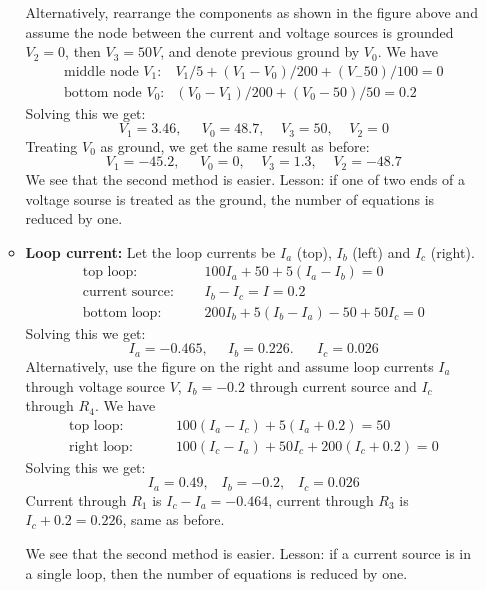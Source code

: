 \begin{enumerate}
\begin{itemize}
    Alternatively, rearrange the components as shown in the figure 
    above and assume the node between the current and voltage sources
    is grounded $V_2=0$, then $V_3=50V$, and denote previous ground by
    $V_0$. We have 
    \[
    \begin{array}{ll}
      \mbox{middle node $V_1$:} & V_1/5+(V_1-V_0)/200+(V_-50)/100=0\\
      \mbox{bottom node $V_0$:} & (V_0-V_1)/200+(V_0-50)/50=0.2 
    \end{array} 
    \]
    Solving this we get: 
    \[
    V_1=3.46,\;\;\;\;\;V_0=48.7,\;\;\;\;V_3=50,\;\;\;\;V_2=0
    \]
    Treating $V_0$ as ground, we get the same result as before: 
    \[
    V_1=-45.2,\;\;\;\;\;V_0=0,\;\;\;\;V_3=1.3,\;\;\;\;V_2=-48.7 
    \]
    We see that the second method is easier. Lesson: if one of two ends 
    of a voltage sourse is treated as the ground, the number of equations 
    is reduced by one.
  \item {\bf Loop current:} Let the loop currents be $I_a$ (top), 
    $I_b$ (left) and $I_c$ (right). 
    \[
    \begin{array}{ll}
      \mbox{top loop:}\;\;\;\;\;\;& 100I_a+50+5(I_a-I_b)=0\\
      \mbox{current source:} \;\;\;\;\;& I_b-I_c=I=0.2\\
      \mbox{bottom loop:}\;\;\;\;\;\;& 200I_b+5(I_b-I_a)-50+50I_c=0 
    \end{array} 
    \]
    Solving this we get: 
    \[
    I_a=-0.465,\;\;\;\;\;I_b=0.226.\;\;\;\;\;\;I_c=0.026 
    \]
    Alternatively, use the figure on the right and assume loop currents 
    $I_a$ through voltage source $V$, $I_b=-0.2$ through current source and 
    $I_c$ through  $R_4$. We have 
    \[
    \begin{array}{ll}
      \mbox{top loop: }\;\;\;\;\;\;\;&100(I_a-I_c)+5(I_a+0.2)=50\\
      \mbox{right loop: }\;\;\;\;\;\;\;&100(I_c-I_a)+50I_c+200(I_c+0.2)=0 
    \end{array}
    \]
    Solving this we get: 
    \[
    I_a=0.49,\;\;\;I_b=-0.2,\;\;\;I_c=0.026 
    \]
    Current through $R_1$ is  $I_c-I_a=-0.464$, current through $R_3$ is 
    $I_c+0.2=0.226$, same as before.

    We see that the second method is easier. Lesson: if a current source 
    is in a single loop, then the number of equations is reduced by one.

  \end{itemize}


\end{enumerate}
